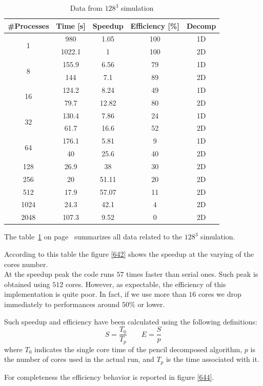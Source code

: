 \begin{table}[h]
\caption{Data from $128^{3}$ simulation}
\begin{center}
\begin{tabular}{c c c c c}
\toprule
\textbf{\#Processes} & \textbf{Time [s]} & \textbf{Speedup} & \textbf{Efficiency [\%]} & \textbf{Decomp}\\
\midrule
\multirow{2}{*}{1} & 980 & 1.05 & 100 & 1D\\
& 1022.1 & 1 & 100 & 2D \\
\hline
\multirow{2}{*}{8} & 155.9 & 6.56 & 79 & 1D\\
& 144 & 7.1 & 89 & 2D\\
\hline
\multirow{2}{*}{16} & 124.2 & 8.24 & 49 & 1D\\
& 79.7 & 12.82 & 80 & 2D\\
\hline
\multirow{2}{*}{32} & 130.4 & 7.86 & 24 & 1D\\
& 61.7 & 16.6 & 52 & 2D\\
\hline
\multirow{2}{*}{64} & 176.1 & 5.81 & 9 & 1D\\
& 40 & 25.6 & 40 & 2D\\
\hline
128 & 26.9 & 38 & 30 & 2D\\

256 & 20 & 51.11 & 20 & 2D\\

512 & 17.9 & 57.07 & 11 & 2D\\

1024 & 24.3 & 42.1 & 4 & 2D\\

2048 & 107.3 & 9.52 & 0 & 2D\\
\bottomrule
\end{tabular}
\end{center}
\label{64data}
\end{table}%


The table~\ref{64data} on page~\pageref{64data} summarizes all data related to the $128^{3}$ simulation. 


\par
According to this table the figure \ref{642} shows the speedup at the varying of the cores number. \\
At the speedup peak the code runs $57$ times faster than serial ones. Such peak is obtained using $512$ cores. However, as expectable, the efficiency of this implementation is quite poor. In fact, if we use more than $16$ cores we drop immediately to performances around $50\%$ or lower. 
\par
Such speedup and efficiency have been calculated using the following definitions:
\[
S = \frac{T_{0}}{T_{p}} \quad \quad E = \frac{S}{p}
\]
where $T_{0}$ indicates the single core time of the pencil decomposed algorithm, $p$ is the number of cores used in the actual run, and $T_{p}$ is the time associated with it. \\
\par
For completeness the efficiency behavior is reported in figure \ref{644}.

